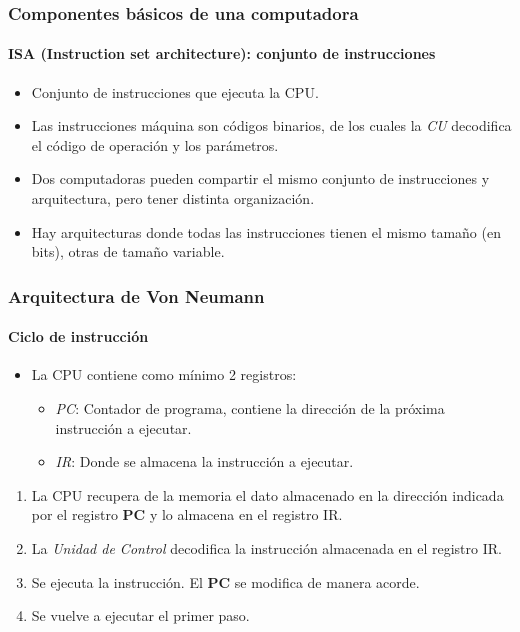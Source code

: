 \documentclass[11pt,a4paper,spanish]{beamer}
\begin{document}
\begin{frame}
    \frametitle{Componentes básicos de una computadora}
    \framesubtitle{ISA (Instruction set architecture): conjunto de
    instrucciones}
    \pause
    \begin{itemize}
        \item Conjunto de instrucciones que ejecuta la CPU. \pause
        \item Las instrucciones máquina son códigos binarios, de los cuales la
            \emph{CU} decodifica el código de operación y los parámetros.
            \pause
        \item Dos computadoras pueden compartir el mismo conjunto de
            instrucciones y arquitectura, pero tener distinta organización.
            \pause
        \item Hay arquitecturas donde todas las instrucciones tienen el mismo
            tamaño (en bits), otras de tamaño variable.
    \end{itemize}
\end{frame}

\begin{frame}
    \frametitle{Arquitectura de Von Neumann}
    \framesubtitle{Ciclo de instrucción}

    \begin{itemize}
        \item La CPU contiene como mínimo 2 registros:
        \begin{itemize}
            \item \emph{PC}: Contador de programa, contiene la dirección de la
                próxima instrucción a ejecutar.
            \item \emph{IR}: Donde se almacena la instrucción a ejecutar.
        \end{itemize}
    \end{itemize}
    \pause
    \begin{enumerate}
        \item La CPU recupera de la memoria el dato almacenado en la dirección
            indicada por el registro \textbf{PC} y lo almacena en el registro
            IR.  \pause
        \item La \emph{Unidad de Control} decodifica la instrucción almacenada
            en el registro IR. \pause
        \item Se ejecuta la instrucción. El \textbf{PC} se modifica de manera
            acorde.  \pause
        \item Se vuelve a ejecutar el primer paso. \pause
    \end{enumerate}
\end{frame}
\end{document}

